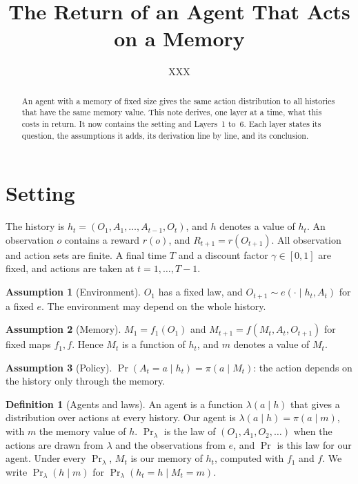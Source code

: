 \documentclass{article}
\title{The Return of an Agent That Acts on a Memory}
\author{XXX}
\theoremstyle{definition}
\newtheorem{definition}[proposition]{Definition}
\newtheorem{assumption}{Assumption}
\numberwithin{equation}{section}
\newcommand{\Prl}{\Pr\nolimits_{\lambda}}
\begin{document}
\maketitle

\begin{abstract}
An agent with a memory of fixed size gives the same action distribution to all histories that have the same memory value. This note derives, one layer at a time, what this costs in return. It now contains the setting and Layers~1 to~6. Each layer states its question, the assumptions it adds, its derivation line by line, and its conclusion.
\end{abstract}

\section{Setting}\label{sec:setting}

The history is $h_t=(O_1,A_1,\dots,A_{t-1},O_t)$, and $h$ denotes a value of $h_t$. An observation $o$ contains a reward $r(o)$, and $R_{t+1}=r(O_{t+1})$. All observation and action sets are finite. A final time $T$ and a discount factor $\gamma\in[0,1]$ are fixed, and actions are taken at $t=1,\dots,T-1$.

\begin{assumption}[Environment]\label{as:env}
$O_1$ has a fixed law, and $O_{t+1}\sim e(\cdot\mid h_t,A_t)$ for a fixed $e$. The environment may depend on the whole history.
\end{assumption}

\begin{assumption}[Memory]\label{as:mem}
$M_1=f_1(O_1)$ and $M_{t+1}=f(M_t,A_t,O_{t+1})$ for fixed maps $f_1,f$. Hence $M_t$ is a function of $h_t$, and $m$ denotes a value of $M_t$.
\end{assumption}

\begin{assumption}[Policy]\label{as:pol}
$\Pr(A_t=a\mid h_t)=\pi(a\mid M_t)$: the action depends on the history only through the memory.
\end{assumption}

\begin{definition}[Agents and laws]\label{def:agent}
An agent is a function $\lambda(a\mid h)$ that gives a distribution over actions at every history. Our agent is $\lambda(a\mid h)=\pi(a\mid m)$, with $m$ the memory value of $h$. $\Prl$ is the law of $(O_1,A_1,O_2,\dots)$ when the actions are drawn from $\lambda$ and the observations from $e$, and $\Pr$ is this law for our agent. Under every $\Prl$, $M_t$ is our memory of $h_t$, computed with $f_1$ and $f$. We write $\Prl(h\mid m)$ for $\Prl(h_t=h\mid M_t=m)$.
\end{definition}
\end{document}
